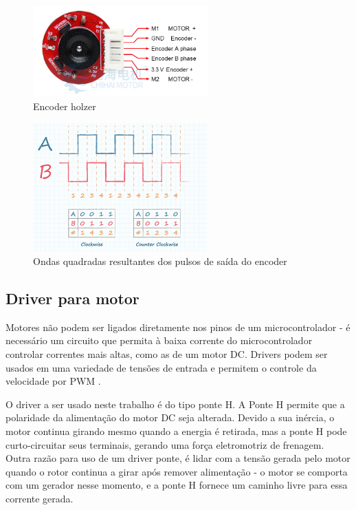 \begin{figure}[h]
	\centering
	\includegraphics[width=0.6\textwidth]{figures/encoder_holzer}
	\caption{Encoder holzer \cite{motor_dc_6v_encoder}}
\end{figure}

\begin{figure}[h]
	\centering
	\includegraphics[width=0.6\textwidth]{figures/encoder_pulso_ab}
	\caption{Ondas quadradas resultantes dos pulsos de saída do encoder \cite{encoder_ppr}}
	\label{encoder_ppr_ab}
\end{figure}


\subsection{Driver para motor}

	Motores não podem ser ligados diretamente nos pinos de um microcontrolador -
	é necessário um circuito que permita à baixa corrente do microcontrolador
	controlar correntes mais altas, como as de um motor DC. Drivers podem ser
	usados em uma variedade de tensões de entrada e permitem o controle da
	velocidade por PWM \cite{toshiba_ponte_h}.

	O driver a ser usado neste trabalho é do tipo ponte H. A Ponte H permite que
	a polaridade da alimentação do motor DC seja alterada. Devido a sua inércia,
	o motor continua girando mesmo quando a energia é retirada, mas a ponte H
	pode curto-circuitar seus terminais, gerando uma força eletromotriz de
	frenagem. Outra razão para uso de um driver ponte, é lidar com a tensão
	gerada pelo motor quando o rotor continua a girar após remover
	alimentação - o motor se comporta com um gerador nesse momento, e a ponte H
	fornece um caminho livre para essa corrente gerada.


